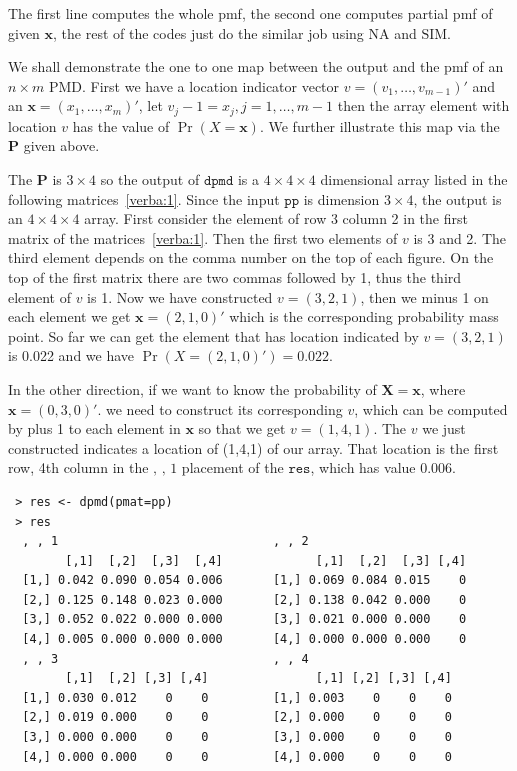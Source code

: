 \documentclass[12pt]{article}
\newcommand{\Pmat}{\mathbf{P}}
\newcommand{\PMD}{\textrm{PMD}}
\newcommand{\Xvec}{\boldsymbol{X}}
\newcommand{\xvec}{\boldsymbol{x}}
\newcommand{\code}{\texttt}
\newcommand{\SIM}{{\textrm{SIM}}}
\newcommand{\NA}{{\textrm{NA}}}
\begin{document}
The first line computes the whole pmf, the second one computes partial pmf of given $\xvec$, the rest of the codes just do the similar job using $\NA$ and $\SIM$.

We shall demonstrate the one to one map between the output and the pmf of an $n \times m$ $\PMD$. First we have a location indicator vector $v = (v_1, \dots, v_{m-1})'$ and an $\xvec=(x_1,\dots,x_m)'$, let $v_j-1 = x_j, j =1,\dots,m-1$ then the array element with location $v$ has the value of $\Pr(X=\xvec)$. We further illustrate this map via the $\Pmat$ given above.

The $\Pmat$ is $3 \times 4$ so the output of $\code{dpmd}$ is a $4 \times 4 \times 4$ dimensional array listed in the following matrices~\ref{verba:1}. Since the input $\code{pp}$ is dimension $3 \times 4$, the output is an $4 \times 4 \times 4$ array. First consider the element of row 3 column 2 in the first matrix of the matrices~\ref{verba:1}. Then the first two elements of $v$ is 3 and 2. The third element depends on the comma number on the top of each figure. On the top of the first matrix there are two commas followed by 1, thus the third element of $v$ is 1. Now we have constructed $v = (3,2,1)$, then we minus 1 on each element we get $\xvec=(2,1,0)'$ which is the corresponding probability mass point. So far we can get the element that has location indicated by $v=(3,2,1)$ is 0.022 and we have $\Pr(X=(2,1,0)')=0.022$.

In the other direction, if we want to know the probability of $\Xvec=\xvec$, where $\xvec=(0,3,0)'$. we need to construct its corresponding $v$, which can be computed by plus 1 to each element in $\xvec$ so that we get $v=(1,4,1)$. The $v$ we just constructed indicates a location of (1,4,1) of our array. That location is the first row, 4th column in the $\text{, , 1}$ placement of the $\code{res}$, which has value 0.006.

\begin{verbatim}
 > res <- dpmd(pmat=pp)
 > res
  , , 1                              , , 2
        [,1]  [,2]  [,3]  [,4]             [,1]  [,2]  [,3] [,4]
  [1,] 0.042 0.090 0.054 0.006       [1,] 0.069 0.084 0.015    0
  [2,] 0.125 0.148 0.023 0.000       [2,] 0.138 0.042 0.000    0
  [3,] 0.052 0.022 0.000 0.000       [3,] 0.021 0.000 0.000    0
  [4,] 0.005 0.000 0.000 0.000       [4,] 0.000 0.000 0.000    0
  , , 3                              , , 4
        [,1]  [,2] [,3] [,4]               [,1] [,2] [,3] [,4]
  [1,] 0.030 0.012    0    0         [1,] 0.003    0    0    0
  [2,] 0.019 0.000    0    0         [2,] 0.000    0    0    0
  [3,] 0.000 0.000    0    0         [3,] 0.000    0    0    0
  [4,] 0.000 0.000    0    0         [4,] 0.000    0    0    0
\end{verbatim}
\label{verba:1}
\end{document}

